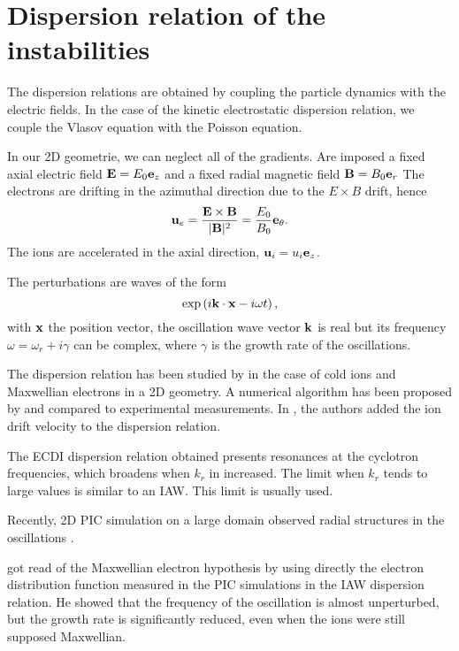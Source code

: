 
\section{Dispersion relation of the instabilities}
  \label{sec-DR-kinetic}
  
  
  The dispersion relations are obtained by coupling the particle dynamics with the electric fields.
  In the case of the kinetic electrostatic dispersion relation, we couple the Vlasov equation with the Poisson equation.
  
  In our \ac{2D} geometrie, we can neglect all of the gradients.
  Are imposed a fixed axial electric field ${\mathbf E} = E_0 {\mathbf e_z}$ and a fixed radial magnetic field ${\mathbf B} = B_0 {\mathbf e_r}$
  The electrons are drifting in the azimuthal direction due to the $E\times B$ drift, hence
  \[ {\mathbf u_{e}} = \frac{{\mathbf E} \times {\mathbf B}}{\lvert{\mathbf B}\rvert^2} = \frac{E_0}{B_0}  {\mathbf e_{\theta}}.    \]
  The ions are accelerated in the axial direction, $ {\mathbf u_i} = u_i  {\mathbf e_z}$.
  
  The perturbations are waves of the form \[ \exp \left( i {\mathbf k} \cdot {\mathbf x} - i \omega t  \right), \]
  with ${\mathbf x}$ the position vector, the oscillation wave vector ${\mathbf k}$ is real but its frequency $\omega = \omega_r + i \gamma$ can be complex, where $\gamma$ is the growth rate of the oscillations. 
  
  \vspace{1em}
  The dispersion relation has been studied by \citet{ducrocq2006} in the case of cold ions and Maxwellian electrons in a \ac{2D} geometry.
  A numerical algorithm has been proposed by \citet{cavalier2013} and compared to experimental measurements.
  In \citet{lafleur2016}, the authors added the ion drift velocity to the dispersion relation.
  
  The \ac{ECDI} dispersion relation obtained presents resonances at the cyclotron frequencies, which broadens when $k_r$ in increased.
  The limit when $k_r$ tends to large values is similar to an \ac{IAW}.
  This limit is usually used.
  
  Recently, \ac{2D} \ac{PIC} simulation on a large domain observed radial structures in the oscillations \citep{janhunen2018,hara2019a}.
  
  \citet{lafleur2018} got read of the Maxwellian electron hypothesis by using directly the electron distribution function measured in the \ac{PIC} simulations in the \ac{IAW} dispersion relation.
  He showed that the frequency of the oscillation is almost unperturbed, but the growth rate is significantly reduced, even when the ions were still supposed Maxwellian.
  
